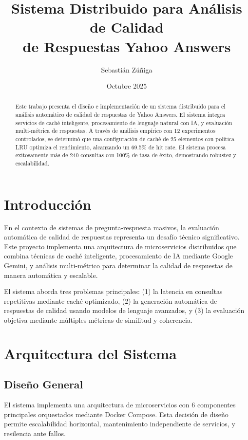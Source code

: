 \documentclass[12pt,a4paper]{article}
\title{\textbf{Sistema Distribuido para Análisis de Calidad\\de Respuestas Yahoo Answers}}
\author{Sebastián Zúñiga}
\date{Octubre 2025}
\begin{document}
\maketitle

\begin{abstract}
Este trabajo presenta el diseño e implementación de un sistema distribuido para el análisis automático de calidad de respuestas de Yahoo Answers. El sistema integra servicios de caché inteligente, procesamiento de lenguaje natural con IA, y evaluación multi-métrica de respuestas. A través de análisis empírico con 12 experimentos controlados, se determinó que una configuración de caché de 25 elementos con política LRU optimiza el rendimiento, alcanzando un 69.5\% de hit rate. El sistema procesa exitosamente más de 240 consultas con 100\% de tasa de éxito, demostrando robustez y escalabilidad.
\end{abstract}

\section{Introducción}

En el contexto de sistemas de pregunta-respuesta masivos, la evaluación automática de calidad de respuestas representa un desafío técnico significativo. Este proyecto implementa una arquitectura de microservicios distribuidos que combina técnicas de caché inteligente, procesamiento de IA mediante Google Gemini, y análisis multi-métrico para determinar la calidad de respuestas de manera automática y escalable.

El sistema aborda tres problemas principales: (1) la latencia en consultas repetitivas mediante caché optimizado, (2) la generación automática de respuestas de calidad usando modelos de lenguaje avanzados, y (3) la evaluación objetiva mediante múltiples métricas de similitud y coherencia.

\section{Arquitectura del Sistema}

\subsection{Diseño General}

El sistema implementa una arquitectura de microservicios con 6 componentes principales orquestados mediante Docker Compose. Esta decisión de diseño permite escalabilidad horizontal, mantenimiento independiente de servicios, y resilencia ante fallos.
\end{document}
